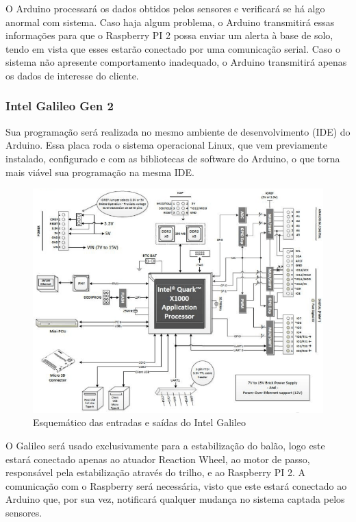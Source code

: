 		O Arduino processará os dados obtidos pelos sensores e verificará se há algo anormal com sistema. Caso haja algum problema, o Arduino transmitirá essas informações para que o Raspberry PI 2 possa enviar um alerta à base de solo, tendo em vista que esses estarão conectado por uma comunicação serial. Caso o sistema não apresente comportamento inadequado, o Arduino transmitirá apenas os dados de interesse do cliente.

	\subsubsection{Intel Galileo Gen 2}

		Sua programação será realizada no mesmo ambiente de desenvolvimento (IDE) do Arduino. Essa placa roda o sistema operacional Linux, que vem previamente instalado, configurado e com as bibliotecas de software do Arduino, o que torna mais viável sua programação na mesma IDE.~\cite{embarcados3}

		\begin{figure}[H]
			\centering
			\includegraphics[width=1\textwidth]{figuras/galileo2}
			\caption[Esquemático das entradas e saídas do Intel Galileo]{Esquemático das entradas e saídas do Intel Galileo~\cite{embarcados3}}
			\label{img:galileo2}
		\end{figure}

		O Galileo será usado exclusivamente para a estabilização do balão, logo este estará conectado apenas ao atuador Reaction Wheel, ao motor de passo, responsável pela estabilização através do trilho, e ao Raspberry PI 2. A comunicação com o Raspberry será necessária, visto que este estará conectado ao Arduino que, por sua vez, notificará qualquer mudança no sistema captada pelos sensores.

